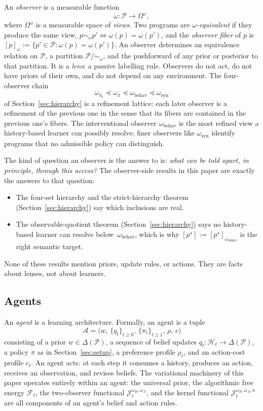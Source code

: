 \documentclass[11pt]{article}
\theoremstyle{definition}
\theoremstyle{remark}
\newcommand{\Acal}{\mathcal{A}}
\newcommand{\Pcal}{\mathcal{P}}
\newcommand{\Hcal}{\mathcal{H}}
\newcommand{\Fcal}{\mathcal{F}}
\begin{document}
An \emph{observer} is a measurable function
\[
\omega:\Pcal\longrightarrow\Omega^\omega,
\]
where $\Omega^\omega$ is a measurable space of \emph{views}. Two programs are \emph{$\omega$-equivalent} if they produce the same view, $p\sim_\omega p'\iff\omega(p)=\omega(p')$, and the \emph{observer fiber} of $p$ is $[p]_\omega:=\{p'\in\Pcal:\omega(p)=\omega(p')\}$. An observer determines an equivalence relation on $\Pcal$, a partition $\Pcal/\!\sim_\omega$, and the pushforward of any prior or posterior to that partition. It is a \emph{lens}: a passive labelling rule. Observers do not act, do not have priors of their own, and do not depend on any environment. The four-observer chain
\[
\omega_{h_t}\preceq\omega_\pi\preceq\omega_{\mathrm{behav}}\preceq\omega_{\mathrm{syn}}
\]
of Section~\ref{sec:hierarchy} is a refinement lattice: each later observer is a refinement of the previous one in the sense that its fibers are contained in the previous one's fibers. The interventional observer $\omega_{\mathrm{behav}}$ is the most refined view a history-based learner can possibly resolve; finer observers like $\omega_{\mathrm{syn}}$ identify programs that no admissible policy can distinguish.

The kind of question an observer is the answer to is: \emph{what can be told apart, in principle, through this access?} The observer-side results in this paper are exactly the answers to that question:
\begin{itemize}
\item The four-set hierarchy and the strict-hierarchy theorem (Section~\ref{sec:hierarchy}) say which inclusions are real.
\item The observable-quotient theorem (Section~\ref{sec:hierarchy}) says no history-based learner can resolve below~$\omega_{\mathrm{behav}}$, which is why $[p^\star]:=[p^\star]_{\omega_{\mathrm{behav}}}$ is the right semantic target.
\end{itemize}
None of these results mention priors, update rules, or actions. They are facts about lenses, not about learners.

\subsection{Agents}
\label{sec:ontology-agents}

An \emph{agent} is a learning architecture. Formally, an agent is a tuple
\[
\Acal=\bigl(w,\,\{q_t\}_{t\ge0},\,\{\pi_t\}_{t\ge1},\,\rho,\,c\bigr)
\]
consisting of a prior $w\in\Delta(\Pcal)$, a sequence of belief updates $q_t:\Hcal_t\to\Delta(\Pcal)$, a policy $\pi$ as in Section~\ref{sec:setup}, a preference profile $\rho_t$, and an action-cost profile $c_t$. An agent acts: at each step it consumes a history, produces an action, receives an observation, and revises beliefs. The variational machinery of this paper operates entirely within an agent: the universal prior, the algorithmic free energy $\Fcal_t$, the two-observer functional $\mathcal J_t^{\omega_B,\omega_A}$, and the kernel functional $\mathcal J_t^{\omega_B,\omega_A,\kappa}$ are all components of an agent's belief and action rules.
\end{document}
